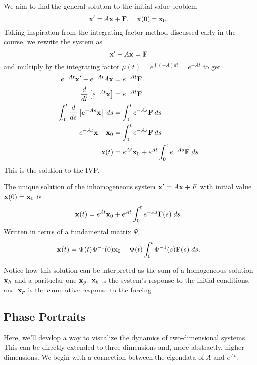 \documentclass[../m082main.tex]{subfiles}
\begin{document}
\begin{example}
    We aim to find the general solution to the initial-value problem
    \[ \mathbf{x}' = A \mathbf{x} + \mathbf{F}, \quad \mathbf{x}(0) = \mathbf{x}_0. \]
    Taking inspiration from the integrating factor method discussed early in the course, we rewrite the system as
    \[ \mathbf{x}' - A \mathbf{x} = \mathbf{F} \]
    and multiply by the integrating factor $\mu(t) = e^{\int (-A) dt} = e^{-A t}$ to get
    \begin{align*}
        e^{-At} \mathbf{x}' - e^{-At} A \mathbf{x} &= e^{-At} \mathbf{F} \\
        \frac{d}{dt} \left[ e^{-At} \mathbf{x} \right] &= e^{-At} \mathbf{F} \\
        \int_0^t \frac{d}{ds} \left[ e^{-As} \mathbf{x} \right] \;ds &= \int_0^t e^{-As} \mathbf{F} \;ds \\
        e^{-At}\mathbf{x} - \mathbf{x}_0 &= \int_{0}^{t} e^{-As} \mathbf{F} \;ds \\
        \mathbf{x}(t) &= e^{At} \mathbf{x}_0 + e^{At} \int_0^t e^{-As} \mathbf{F} \;ds
    \end{align*}
    This is the solution to the IVP.
\end{example}

\begin{theorem}
    The unique solution of the inhomogeneous system $\mathbf{x}' = A \mathbf{x} + F$ with initial value $\mathbf{x}(0) = \mathbf{x}_0$ is
    \[ \mathbf{x}(t) = e^{At} \mathbf{x}_0 + e^{At} \int_0^t e^{-As} \mathbf{F}(s) \;ds. \]
    Written in terms of a fundamental matrix $\Psi$,
    \[ \mathbf{x}(t) = \Psi(t) \Psi^{-1}(0) \mathbf{x}_0 + \Psi(t) \int_0^t \Psi^{-1}(s) \mathbf{F}(s) \;ds. \]
\end{theorem}

Notice how this solution can be interpreted as the sum of a homogeneous solution $\mathbf{x}_h$ and a parituclar one $\mathbf{x}_p$.
$\mathbf{x}_h$ is the system's response to the initial conditions, and $\mathbf{x}_p$ is the cumulative response to the forcing.

\subsection{Phase Portraits}
Here, we'll develop a way to visualize the dynamics of two-dimensional systems.
This can be directly extended to three dimensions and, more abstractly, higher dimensions.
We begin with a connection between the eigendata of $A$ and $e^{At}$.
\end{document}

